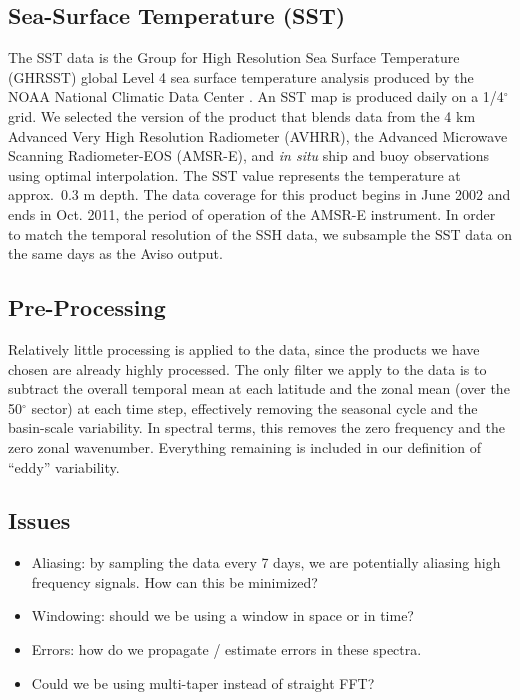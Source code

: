 \documentclass[10pt]{article}
\begin{document}
\subsection{Sea-Surface Temperature (SST)}

The SST data is the Group for High Resolution Sea Surface Temperature (GHRSST) global Level 4 sea surface temperature analysis produced by the NOAA National Climatic Data Center \citep{ReynoldsEtAl2007}. An SST map is produced daily on a 1/4$^\circ$ grid. We selected the version of the product that blends data from the 4 km Advanced Very High Resolution Radiometer (AVHRR), the Advanced Microwave Scanning Radiometer-EOS (AMSR-E), and {\em in situ} ship and buoy observations using optimal interpolation. The SST value represents the temperature at approx.~0.3 m depth. The data coverage for this product begins in June 2002 and ends in Oct. 2011, the period of operation of the AMSR-E instrument. In order to match the temporal resolution of the SSH data, we subsample the SST data on the same days as the Aviso output.

\subsection{Pre-Processing}

Relatively little processing is applied to the data, since the products we have chosen are already highly processed. The only filter we apply to the data is to subtract the overall temporal mean at each latitude and the zonal mean (over the 50$^\circ$ sector) at each time step, effectively removing the seasonal cycle and the basin-scale variability. In spectral terms, this removes the zero frequency and the zero zonal wavenumber. Everything remaining is included in our definition of ``eddy'' variability.

\subsection{Issues}
\begin{itemize}
\item Aliasing: by sampling the data every 7 days, we are potentially aliasing high frequency signals. How can this be minimized?
\item Windowing: should we be using a window in space or in time?
\item Errors: how do we propagate / estimate errors in these spectra.
\item Could we be using multi-taper instead of straight FFT?
\end{itemize}
\end{document}
